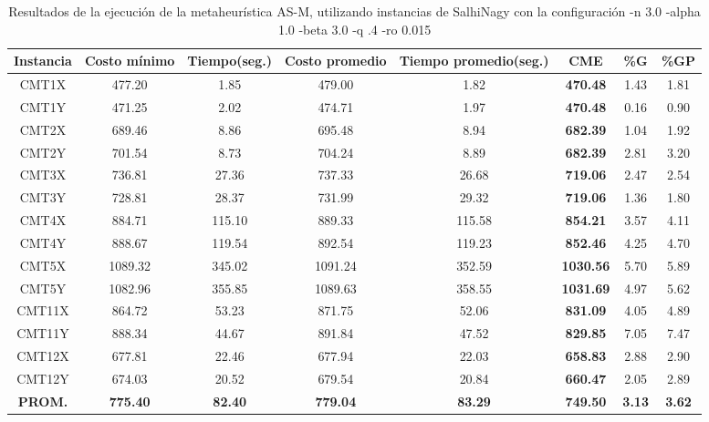 \begin{table}[h]
\caption{Resultados de la ejecución de la metaheurística AS-M, utilizando instancias de SalhiNagy con la configuración -n 3.0 -alpha 1.0 -beta 3.0 -q .4 -ro 0.015}
\centering
\small
\begin{tabular}{c c c c c c c c}
\hline\hline
Instancia & Costo mínimo & Tiempo(seg.) & Costo promedio & Tiempo promedio(seg.) & CME & \%G & \%GP \\ [0.5ex]
\hline
CMT1X & 477.20 & 1.85 & 
479.00 & 1.82 & \bf{470.48} & 
1.43 & 1.81\\CMT1Y & 471.25 & 2.02 & 
474.71 & 1.97 & \bf{470.48} & 
0.16 & 0.90\\CMT2X & 689.46 & 8.86 & 
695.48 & 8.94 & \bf{682.39} & 
1.04 & 1.92\\CMT2Y & 701.54 & 8.73 & 
704.24 & 8.89 & \bf{682.39} & 
2.81 & 3.20\\CMT3X & 736.81 & 27.36 & 
737.33 & 26.68 & \bf{719.06} & 
2.47 & 2.54\\CMT3Y & 728.81 & 28.37 & 
731.99 & 29.32 & \bf{719.06} & 
1.36 & 1.80\\CMT4X & 884.71 & 115.10 & 
889.33 & 115.58 & \bf{854.21} & 
3.57 & 4.11\\CMT4Y & 888.67 & 119.54 & 
892.54 & 119.23 & \bf{852.46} & 
4.25 & 4.70\\CMT5X & 1089.32 & 345.02 & 
1091.24 & 352.59 & \bf{1030.56} & 
5.70 & 5.89\\CMT5Y & 1082.96 & 355.85 & 
1089.63 & 358.55 & \bf{1031.69} & 
4.97 & 5.62\\CMT11X & 864.72 & 53.23 & 
871.75 & 52.06 & \bf{831.09} & 
4.05 & 4.89\\CMT11Y & 888.34 & 44.67 & 
891.84 & 47.52 & \bf{829.85} & 
7.05 & 7.47\\CMT12X & 677.81 & 22.46 & 
677.94 & 22.03 & \bf{658.83} & 
2.88 & 2.90\\CMT12Y & 674.03 & 20.52 & 
679.54 & 20.84 & \bf{660.47} & 
2.05 & 2.89\\\bf{PROM.} & 
\bf{775.40} & \bf{82.40} & \bf{779.04} & \bf{83.29} & \bf{749.50} & \bf{3.13} & \bf{3.62}\\[1ex]\hline
\end{tabular}
\label{table:nonlin}
\end{table}
